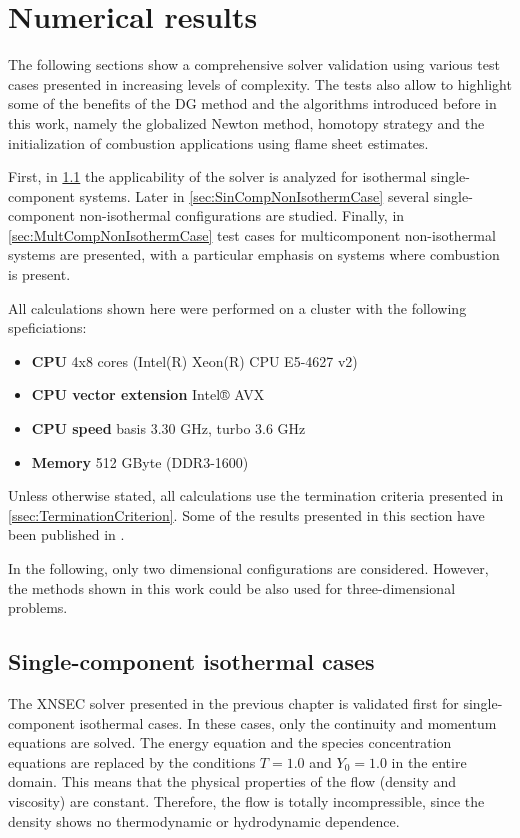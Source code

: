 \chapter{Numerical results}	\label{ch:results}
The following sections show a comprehensive solver validation using various test cases presented in increasing levels of complexity. The tests also allow to highlight some of the benefits of the DG method and the algorithms introduced before in this work, namely the globalized Newton method, homotopy strategy and the initialization of combustion applications using flame sheet estimates. 

First, in \cref{sec:SingleCompIsotCase} the applicability of the solver is analyzed for isothermal single-component systems. Later in \cref{sec:SinCompNonIsothermCase} several single-component non-isothermal configurations are studied. Finally, in \cref{sec:MultCompNonIsothermCase} test cases for multicomponent non-isothermal systems are presented, with a particular emphasis on systems where combustion is present.

All calculations shown here were performed on a cluster with the following speficiations:
\begin{itemize}
    \item \textbf{CPU} 4x8 cores (Intel(R) Xeon(R) CPU E5-4627 v2)
    \item \textbf{CPU vector extension} Intel® AVX
    \item \textbf{CPU speed} basis 3.30 GHz, turbo 3.6 GHz
    \item \textbf{Memory} 512 GByte (DDR3-1600)
\end{itemize}
Unless otherwise stated, all calculations use the termination criteria presented in \cref{ssec:TerminationCriterion}.
Some of the results presented in this section have been published in \parencite{gutierrez-jorqueraFullyCoupledHighorder2022}.

In the following, only two dimensional configurations are considered. However, the methods shown in this work could be also used for three-dimensional problems. 
\section{Single-component isothermal cases}\label{sec:SingleCompIsotCase}
The XNSEC solver presented in the previous chapter is validated first for single-component isothermal cases. In these cases, only the continuity and momentum equations are solved. The energy equation and the species concentration equations are replaced by the conditions $T = 1.0$ and $Y_0 = 1.0$ in the entire domain. This means that the physical properties of the flow (density and viscosity) are constant. Therefore, the flow is totally incompressible, since the density shows no thermodynamic or hydrodynamic dependence.


